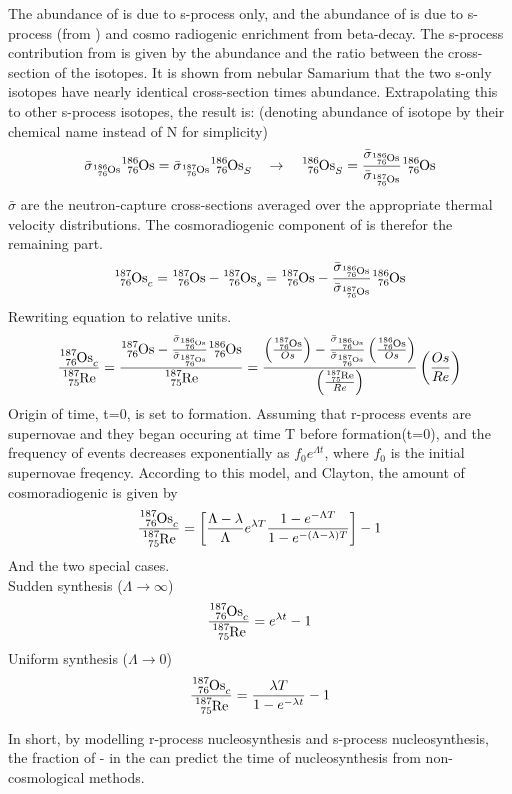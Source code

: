 The abundance of  is due to s-process only, and the abundance of  is due to s-process (from ) and cosmo radiogenic enrichment from  beta-decay.
The s-process contribution from  is given by the  abundance and the ratio between the cross-section of the isotopes. It is shown from nebular Samarium that the two s-only isotopes have nearly identical cross-section times abundance. Extrapolating this to other s-process isotopes, the result is:
(denoting abundance of isotope by their chemical name instead of N for simplicity)
\begin{equation}
  \bar{\sigma}_{\os{186}}{\os{186}} = \bar{\sigma}_{\os{187}}{\os{186}_S}
  \quad \rightarrow \quad
  {\os{186}_S} = \frac{\bar{\sigma}_{\os{186}}}{\bar{\sigma}_{\os{187}}}{\os{186}}
\end{equation}
$\bar{\sigma}$ are the neutron-capture cross-sections averaged over the appropriate thermal velocity distributions.
The cosmoradiogenic component of  is therefor the remaining part.
\begin{equation}
  \os{187}_c = \os{187} - \os{187}_s = \os{187} - \frac{\bar{\sigma}_{\os{186}}}{\bar{\sigma}_{\os{187}}}{\os{186}}
\end{equation}
Rewriting equation to relative units.
\begin{equation}
  \frac{\os{187}_c}{\re{187}} = \frac{\os{187} - \frac{\bar{\sigma}_{\os{186}}}{\bar{\sigma}_{\os{187}}}{\os{186}}}{\re{187}} =
  \frac{
    \left(\frac{\os{187}}{Os}\right) -
    \frac{\bar{\sigma}_{\os{186}}}{\bar{\sigma}_{\os{187}}}
    \left(\frac{\os{186}}{Os}\right)
  }{
    \left(\frac{\re{187}}{Re}\right)
  }
  \left(\frac{Os}{Re}\right)
\end{equation}
Origin of time, t=0, is set to \sos formation. Assuming that r-process events are supernovae and they began occuring at time T before \sos formation(t=0), and the frequency of events decreases exponentially as $f_0e^{\Lambda t}$, where $f_0$ is the initial supernovae freqency.
According to this model, and Clayton, the amount of cosmoradiogenic  is given by
\begin{equation}
  \frac{\os{187}_c}{\re{187}} = \left[
    \frac{\Lambda-\lambda}{\Lambda}
    e^{\lambda T}
    \frac{1-e^{-\Lambda T}}{1-e^{-(\Lambda-\lambda) T}}
    \right] - 1
\end{equation}
And the two special cases. \\
Sudden synthesis ($\Lambda\rightarrow\infty$)
\begin{equation}
  \frac{\os{187}_c}{\re{187}} = e^{\lambda t} - 1
\end{equation}
Uniform synthesis ($\Lambda\rightarrow 0$)
\begin{equation}
  \frac{\os{187}_c}{\re{187}} = \frac{\lambda T}{1-e^{-\lambda t}} - 1
\end{equation}


In short, by modelling r-process nucleosynthesis and s-process nucleosynthesis, the fraction of - in the \sos can predict the time of nucleosynthesis from non-cosmological methods.
\fi
